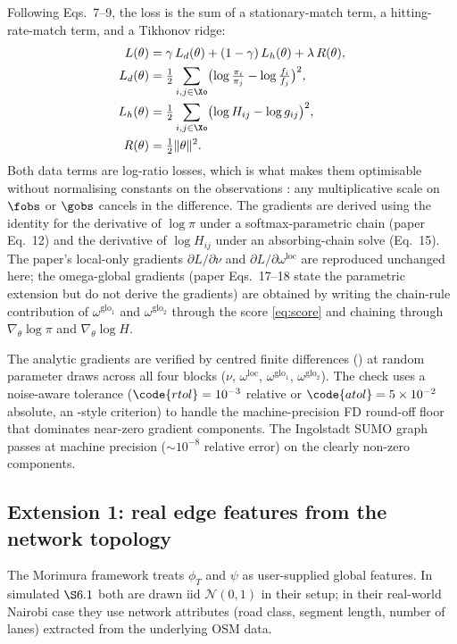 Following \cite{morimura2013} Eqs.~7--9, the loss is the sum of a
stationary-match term, a hitting-rate-match term, and a Tikhonov ridge:
\begin{align}
L(\theta) &= \gamma\,L_d(\theta) + (1-\gamma)\,L_h(\theta) + \lambda\,R(\theta), \\
L_d(\theta) &= \tfrac{1}{2}\sum_{i, j \in \Xo}\bigl(\log\tfrac{\pi_i}{\pi_j} - \log\tfrac{f_i}{f_j}\bigr)^2, \\
L_h(\theta) &= \tfrac{1}{2}\sum_{i, j \in \Xo}\bigl(\log H_{ij} - \log g_{ij}\bigr)^2, \\
R(\theta) &= \tfrac{1}{2}\|\theta\|^2.
\end{align}
Both data terms are log-ratio losses, which is what makes them
optimisable without normalising constants on the observations
\cite{morimura2013}: any multiplicative scale on $\fobs$ or $\gobs$
cancels in the difference. The gradients are derived using the
identity for the derivative of $\log\pi$ under a softmax-parametric
chain (paper Eq.~12) and the derivative of $\log H_{ij}$ under an
absorbing-chain solve (Eq.~15). The paper's local-only gradients
$\partial L / \partial \nu$ and $\partial L / \partial \omega^{\mathrm{loc}}$
are reproduced unchanged here; the omega-global
gradients (paper Eqs.~17--18 state the parametric extension but
do not derive the gradients) are obtained by writing the chain-rule contribution of
$\omega^{\mathrm{glo}_1}$ and $\omega^{\mathrm{glo}_2}$ through the
score \eqref{eq:score} and chaining through $\nabla_\theta \log \pi$ and
$\nabla_\theta \log H$.

The analytic gradients are verified by centred finite differences
() at random parameter draws across
all four blocks ($\nu$, $\omega^{\mathrm{loc}}$, $\omega^{\mathrm{glo}_1}$,
$\omega^{\mathrm{glo}_2}$). The check uses a noise-aware tolerance
($\code{rtol}=10^{-3}$ relative or $\code{atol}=5 \times 10^{-2}$
absolute, an -style criterion) to handle the
machine-precision FD round-off floor that dominates near-zero gradient
components. The Ingolstadt SUMO graph passes at machine precision
($\sim 10^{-8}$ relative error) on the clearly non-zero components.

\subsection{Extension 1: real edge features from the network topology}
\label{sec:features}

The Morimura framework treats $\phi_T$ and $\psi$ as user-supplied global
features. In simulated $\S 6.1$ both are drawn iid
$\mathcal{N}(0,1)$ in their setup; in their real-world Nairobi case
they use network attributes (road class, segment length, number of
lanes) extracted from the underlying OSM data.

